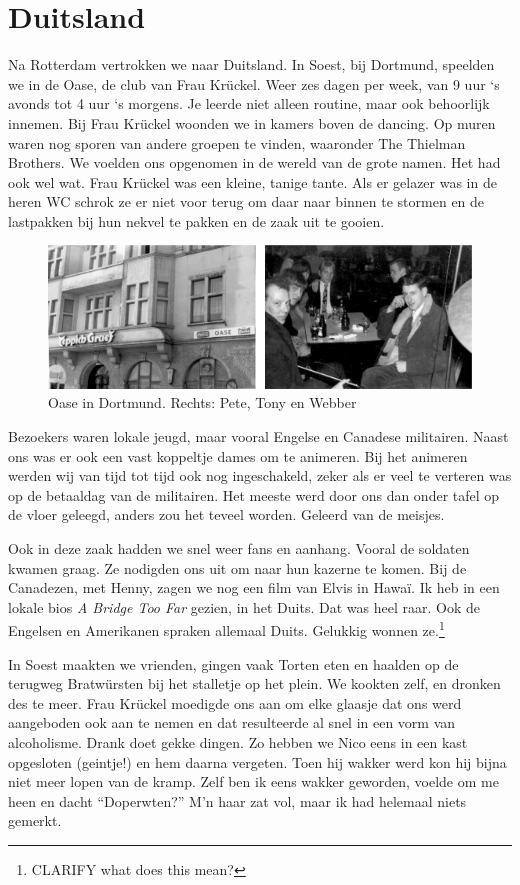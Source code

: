 \documentclass[12pt,twoside, openright]{memoir}
\begin{document}
\chapter{Duitsland} %
\label{cha:duitsland}

Na Rotterdam vertrokken we naar Duitsland. In Soest, bij Dortmund, speelden we in de Oase, de club van Frau Krückel. Weer zes dagen per week, van 9 uur `s avonds tot 4 uur `s morgens. Je leerde niet alleen routine, maar ook behoorlijk innemen. Bij Frau Krückel woonden we in kamers boven de dancing. Op muren waren nog sporen van andere groepen te vinden, waaronder The Thielman Brothers. We voelden ons opgenomen in de wereld van de grote namen. Het had ook wel wat. Frau Krückel was een kleine, tanige tante. Als er gelazer was in de heren WC schrok ze er niet voor terug om daar naar binnen te stormen en de lastpakken bij hun nekvel te pakken en de zaak uit te gooien.

\begin{figure}
\includegraphics[width=\textwidth]{img/ch29/double}
\caption*{\footnotesize Oase in Dortmund. Rechts: Pete, Tony en Webber}
\end{figure}

Bezoekers waren lokale jeugd, maar vooral Engelse en Canadese militairen. Naast ons was er ook een vast koppeltje dames om te animeren. Bij het animeren werden wij van tijd tot tijd ook nog ingeschakeld, zeker als er veel te verteren was op de betaaldag van de militairen. Het meeste werd door ons dan onder tafel op de vloer geleegd, anders zou het teveel worden. Geleerd van de meisjes. 

Ook in deze zaak hadden we snel weer fans en aanhang. Vooral de soldaten kwamen graag. Ze nodigden ons uit om naar hun kazerne te komen. Bij de Canadezen, met Henny, zagen we nog een film van Elvis in Hawaï. Ik heb in een lokale bios \emph{A Bridge Too Far} gezien, in het Duits. Dat was heel raar. Ook de Engelsen en Amerikanen spraken allemaal Duits. Gelukkig wonnen ze.\footnote{CLARIFY what does this mean?}

In Soest maakten we vrienden, gingen vaak Torten eten en haalden op de terugweg Bratwürsten bij het stalletje op het plein. We kookten zelf, en dronken des te meer. Frau Krückel moedigde ons aan om elke glaasje dat ons werd aangeboden ook aan te nemen en dat resulteerde al snel in een vorm van alcoholisme. Drank doet gekke dingen. Zo hebben we Nico eens in een kast opgesloten (geintje!) en hem daarna vergeten. Toen hij wakker werd kon hij bijna niet meer lopen van de kramp. Zelf ben ik eens wakker geworden, voelde om me heen en dacht ``Doperwten?'' M’n haar zat vol, maar ik had helemaal niets gemerkt. 
\end{document}
